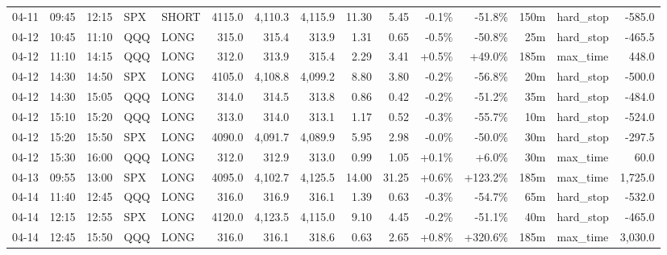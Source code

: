 \documentclass[11pt,a4paper,twoside]{article}
\begin{document}
\begin{landscape}
\begin{center}
\begin{longtable}{>{\color{txtmain}}l l l l l r r r r r r r r >{\color{txtmain}}l r}
04-11 & 09:45 & 12:15 & SPX & SHORT & 4115.0 & 4,110.3 & 4,115.9 & 11.30 & 5.45 & \textcolor{lossred}{-0.1\%} & \textcolor{lossred}{-51.8\%} & 150m & hard\_stop & \textcolor{lossred}{-585.0} \\
04-12 & 10:45 & 11:10 & QQQ & LONG & 315.0 & 315.4 & 313.9 & 1.31 & 0.65 & \textcolor{lossred}{-0.5\%} & \textcolor{lossred}{-50.8\%} & 25m & hard\_stop & \textcolor{lossred}{-465.5} \\
04-12 & 11:10 & 14:15 & QQQ & LONG & 312.0 & 313.9 & 315.4 & 2.29 & 3.41 & \textcolor{wingreen}{+0.5\%} & \textcolor{wingreen}{+49.0\%} & 185m & max\_time & \textcolor{wingreen}{448.0} \\
04-12 & 14:30 & 14:50 & SPX & LONG & 4105.0 & 4,108.8 & 4,099.2 & 8.80 & 3.80 & \textcolor{lossred}{-0.2\%} & \textcolor{lossred}{-56.8\%} & 20m & hard\_stop & \textcolor{lossred}{-500.0} \\
04-12 & 14:30 & 15:05 & QQQ & LONG & 314.0 & 314.5 & 313.8 & 0.86 & 0.42 & \textcolor{lossred}{-0.2\%} & \textcolor{lossred}{-51.2\%} & 35m & hard\_stop & \textcolor{lossred}{-484.0} \\
04-12 & 15:10 & 15:20 & QQQ & LONG & 313.0 & 314.0 & 313.1 & 1.17 & 0.52 & \textcolor{lossred}{-0.3\%} & \textcolor{lossred}{-55.7\%} & 10m & hard\_stop & \textcolor{lossred}{-524.0} \\
04-12 & 15:20 & 15:50 & SPX & LONG & 4090.0 & 4,091.7 & 4,089.9 & 5.95 & 2.98 & \textcolor{lossred}{-0.0\%} & \textcolor{lossred}{-50.0\%} & 30m & hard\_stop & \textcolor{lossred}{-297.5} \\
04-12 & 15:30 & 16:00 & QQQ & LONG & 312.0 & 312.9 & 313.0 & 0.99 & 1.05 & \textcolor{wingreen}{+0.1\%} & \textcolor{wingreen}{+6.0\%} & 30m & max\_time & \textcolor{wingreen}{60.0} \\
04-13 & 09:55 & 13:00 & SPX & LONG & 4095.0 & 4,102.7 & 4,125.5 & 14.00 & 31.25 & \textcolor{wingreen}{+0.6\%} & \textcolor{wingreen}{+123.2\%} & 185m & max\_time & \textcolor{wingreen}{1,725.0} \\
04-14 & 11:40 & 12:45 & QQQ & LONG & 316.0 & 316.9 & 316.1 & 1.39 & 0.63 & \textcolor{lossred}{-0.3\%} & \textcolor{lossred}{-54.7\%} & 65m & hard\_stop & \textcolor{lossred}{-532.0} \\
04-14 & 12:15 & 12:55 & SPX & LONG & 4120.0 & 4,123.5 & 4,115.0 & 9.10 & 4.45 & \textcolor{lossred}{-0.2\%} & \textcolor{lossred}{-51.1\%} & 40m & hard\_stop & \textcolor{lossred}{-465.0} \\
04-14 & 12:45 & 15:50 & QQQ & LONG & 316.0 & 316.1 & 318.6 & 0.63 & 2.65 & \textcolor{wingreen}{+0.8\%} & \textcolor{wingreen}{+320.6\%} & 185m & max\_time & \textcolor{wingreen}{3,030.0} \\

\end{longtable}
\end{center}
\end{landscape}
\end{document}
